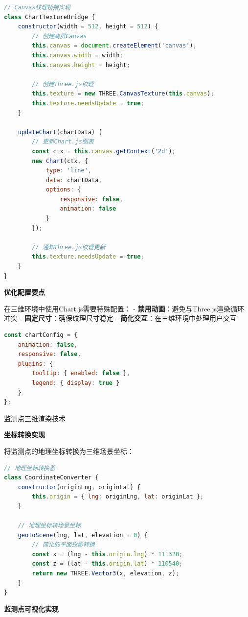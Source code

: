 \begin{lstlisting}[language=Javascript]
// Canvas纹理桥接实现
class ChartTextureBridge {
    constructor(width = 512, height = 512) {
        // 创建离屏Canvas
        this.canvas = document.createElement('canvas');
        this.canvas.width = width;
        this.canvas.height = height;
        
        // 创建Three.js纹理
        this.texture = new THREE.CanvasTexture(this.canvas);
        this.texture.needsUpdate = true;
    }
    
    updateChart(chartData) {
        // 更新Chart.js图表
        const ctx = this.canvas.getContext('2d');
        new Chart(ctx, {
            type: 'line',
            data: chartData,
            options: {
                responsive: false,
                animation: false
            }
        });
        
        // 通知Three.js纹理更新
        this.texture.needsUpdate = true;
    }
}
\end{lstlisting}

\textbf{优化配置要点}

在三维环境中使用Chart.js需要特殊配置： - \textbf{禁用动画}：避免与Three.js渲染循环冲突 - \textbf{固定尺寸}：确保纹理尺寸稳定 - \textbf{简化交互}：在三维环境中处理用户交互

\begin{lstlisting}[language=Javascript]
const chartConfig = {
    animation: false,
    responsive: false,
    plugins: {
        tooltip: { enabled: false },
        legend: { display: true }
    }
};
\end{lstlisting}

 监测点三维渲染技术

\textbf{坐标转换实现}

将监测点的地理坐标转换为三维场景坐标：

\begin{lstlisting}[language=Javascript]
// 地理坐标转换器
class CoordinateConverter {
    constructor(originLng, originLat) {
        this.origin = { lng: originLng, lat: originLat };
    }
    
    // 地理坐标转场景坐标
    geoToScene(lng, lat, elevation = 0) {
        // 简化的平面投影转换
        const x = (lng - this.origin.lng) * 111320;
        const z = (lat - this.origin.lat) * 110540;
        return new THREE.Vector3(x, elevation, z);
    }
}
\end{lstlisting}

\textbf{监测点可视化实现}

